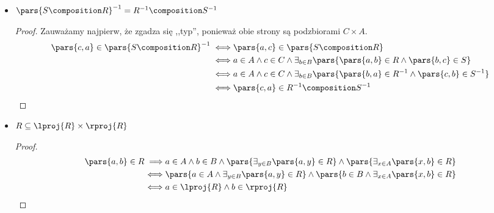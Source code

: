 \begin{description}
\begin{itemize}
\begin{proof}
\begin{equation*}
\begin{split}
                                \iff& a \in A \land d \in D \land \exists_{b \in B} \pars{\pars{a, b} \in R \land \pars{b, d} \in T \composition S}\\
                                \iff& \pars{a, d} \in \pars{T \composition S} \composition R
                        \end{split}
                    \end{equation*}
                \end{proof}
            \item \(\pars{S \composition R}^{-1} = R^{-1} \composition S^{-1}\)
                \begin{proof}
                    Zauważamy najpierw, że zgadza się ,,typ'', ponieważ obie strony są podzbiorami \(C \times A\).
                    \begin{equation*}
                        \begin{split}
                            \pars{c, a} \in \pars{S \composition R}^{-1}
                                \iff& \pars{a, c} \in \pars{S \composition R}\\
                                \iff& a \in A \land c \in C \land \exists_{b \in B} \pars{\pars{a, b} \in R \land \pars{b, c} \in S}\\
                                \iff& a \in A \land c \in C \land \exists_{b \in B} \pars{\pars{b, a} \in R^{-1} \land \pars{c, b} \in S^{-1}}\\
                                \iff& \pars{c, a} \in R^{-1} \composition S^{-1}
                        \end{split}
                    \end{equation*}
                \end{proof}
            \item \(R \subseteq \lproj{R} \times \rproj{R}\)
                \begin{proof}
                    \begin{equation*}
                        \begin{split}
                            \pars{a, b} \in R
                                \implies& a \in A \land b \in B \land \pars{\exists_{y \in B} \pars{a, y} \in R} \land \pars{\exists_{x \in A} \pars{x, b} \in R}\\
                                \iff& \pars{a \in A \land \exists_{y \in B} \pars{a, y} \in R} \land \pars{b \in B \land \exists_{x \in A} \pars{x, b} \in R}\\
                                \iff& a \in \lproj{R} \land b \in \rproj{R}\\

\end{split}
\end{equation*}
\end{proof}
\end{itemize}
\end{description}
